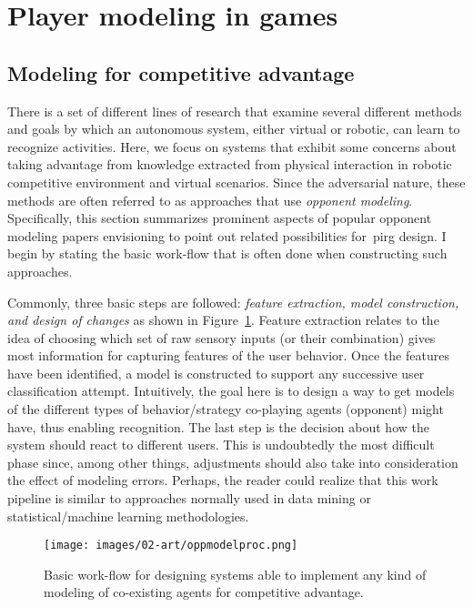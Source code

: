 \section{Player modeling in games}
\subsection{Modeling for competitive advantage}
\label{compadvantage}
There is a set of different lines of research that examine several different methods and goals by which an autonomous system, either virtual or robotic, can learn to recognize activities. Here, we focus on systems that exhibit some concerns about taking advantage from knowledge extracted from physical interaction in robotic competitive environment and virtual scenarios. Since the adversarial nature, these methods are often referred to as approaches that use \textit{opponent modeling}.  Specifically, this section summarizes prominent aspects of popular opponent modeling papers envisioning to point out related possibilities for~\gls{pirg} design. I begin by stating the basic work-flow that is often done when constructing such approaches. 

Commonly, three basic steps are followed: \textit{feature extraction, model construction, and design of changes} as shown in Figure~\ref{behaviorModWorkFlow}. Feature extraction relates to the idea of choosing which set of raw sensory inputs (or their combination) gives most information for capturing features of the user behavior. Once the features have been identified, a model is constructed to support any successive user classification attempt. Intuitively, the goal here is to design a way to get models of the different types of behavior/strategy co-playing agents (opponent) might have, thus enabling recognition. The last step is the decision about how the system should react to different users. This is undoubtedly the most difficult phase since, among other things, adjustments should also take into consideration the effect of modeling errors. Perhaps, the reader could realize that this work pipeline is similar to approaches normally used in data mining or statistical/machine learning methodologies.

\begin{figure}[htp]
  \centering  
  \texttt{[image: images/02-art/oppmodelproc.png]}
  \caption{Basic work-flow for designing systems able to implement any kind of modeling of co-existing agents for competitive advantage.}
   \label{behaviorModWorkFlow}
\end{figure}

